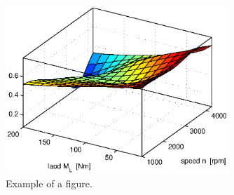 \begin{figure}[ht]
   \centering
   \includegraphics[width=0.75\textwidth]{img/k_surf.eps}
   \caption{Example of a figure.}
   \label{img:k_surf}
\end{figure}
